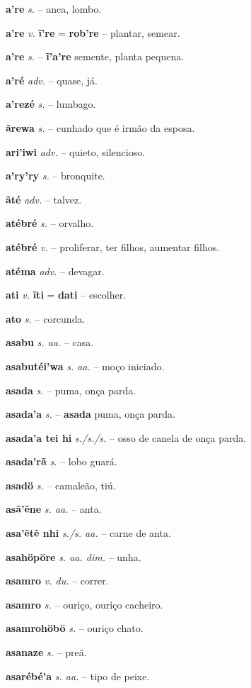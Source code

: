 \textbf{a're} \textit{s.} -- anca, lombo.

\textbf{a're} \textit{v.} \textbf{ĩ're} = \textbf{rob're} -- plantar, semear.

\textbf{a're} \textit{s.} -- \textbf{ĩ'a're} semente, planta pequena.

\textbf{a'ré} \textit{adv.} -- quase, já.

\textbf{a'rezé} \textit{s.} -- lumbago.

\textbf{ãrewa} \textit{s.} -- cunhado que é irmão da esposa.

\textbf{ari'iwi} \textit{adv.} -- quieto, silencioso.

\textbf{a'ry'ry} \textit{s.} -- bronquite.

\textbf{ãté} \textit{adv.} -- talvez.

\textbf{atébré} \textit{s.} -- orvalho.

\textbf{atébré } \textit{v.} -- proliferar, ter filhos, aumentar filhos.

\textbf{atéma} \textit{adv.} -- devagar.

\textbf{ati} \textit{v.} \textbf{ĩti} = \textbf{dati} -- escolher.

\textbf{ato} \textit{s.} -- corcunda.

\textbf{asabu} \textit{s. aa.} -- casa.

\textbf{asabutéi'wa} \textit{s. aa.} -- moço iniciado.

\textbf{asada} \textit{s.} -- puma, onça parda.

\textbf{asada'a} \textit{s.} -- \textbf{asada} puma, onça parda.

\textbf{asada'a tei hi} \textit{s./s./s.} -- osso de canela de onça parda.

\textbf{asada'rã} \textit{s.} -- lobo guará.

\textbf{asadö} \textit{s.} -- camaleão, tiú.

\textbf{asã'ẽne} \textit{s. aa.} -- anta.

\textbf{asa'ẽtẽ nhi} \textit{s./s. aa.} -- carne de anta.

\textbf{asahöpöre} \textit{s. aa. dim.} -- unha.

\textbf{asamro} \textit{v. du.} -- correr.

\textbf{asamro} \textit{s.} -- ouriço, ouriço cacheiro.

\textbf{asamrohöbö} \textit{s.} -- ouriço chato.

\textbf{asanaze} \textit{s.} -- preã.

\textbf{asarébé'a} \textit{s. aa.} -- tipo de peixe.

